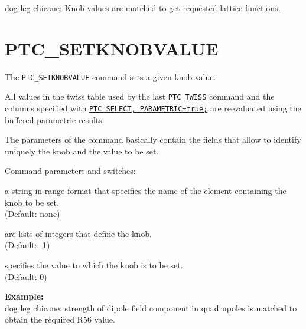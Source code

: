 \href{http://cern.ch/frs/mad-X_examples/ptc_madx_interface/matchknobs/matchknobs.madx}{dog
  leg chicane}: Knob values are matched to get requested lattice
functions.  


 
% 


\section{PTC\_SETKNOBVALUE}
\label{sec:ptc-setknobvalue}

The \texttt{PTC\_SETKNOBVALUE} command sets a given knob value.


All values in the twiss table used by the last \texttt{PTC\_TWISS}
command and the columns specified with
\hyperref[sec:ptc-select]{\texttt{PTC\_SELECT, PARAMETRIC=true;}}  are
reevaluated using the buffered parametric results.

The parameters of the command basically contain the fields that allow
to identify uniquely the knob and the value to be set.

Command parameters and switches:
\begin{madlist}
    a string in range format that specifies the name
   of the element containing the knob to be set. \\
     (Default: none) 

    are lists of integers that define the knob.\\
   (Default: -1)   

    specifies the value to which the knob is to be set.\\
   (Default: 0)
\end{madlist}

\textbf{Example:}\\
\href{http://cern.ch/frs/mad-X_examples/ptc_madx_interface/matchknobs/matchknobs.madx}{dog
  leg chicane}: strength of dipole field component in quadrupoles is
matched to obtain the required R56 value.    


